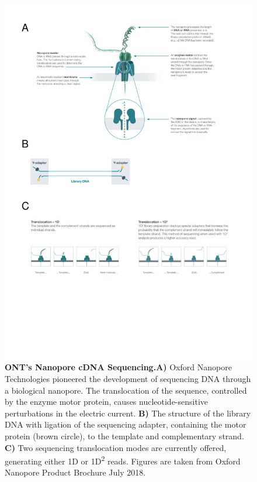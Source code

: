 \begin{figure}[]
	\centering
	\includegraphics[page=1,trim={0 6cm 0 0 },clip, scale = 0.8]{Figures/ProjectDevelopment_FiguresONT}
	\captionsetup{width=0.95\textwidth}
	\caption[ONT's Nanopore cDNA Sequencing]%
	{\textbf{ONT's Nanopore cDNA Sequencing.}\textbf{A)} Oxford Nanopore Technologies pioneered the development of sequencing DNA through a biological nanopore. The translocation of the sequence, controlled by the enzyme motor protein, causes nucleotide-sensitive perturbations in the electric current. \textbf{B)} The structure of the library DNA with ligation of the sequencing adapter, containing the motor protein (brown circle), to the template and complementary strand. \textbf{C)} Two sequencing translocation modes are currently offered, generating either 1D or 1D\textsuperscript{2} reads. Figures are taken from Oxford Nanopore Product Brochure July 2018.}
	\label{fig:ONT_Mechanism}
\end{figure}

